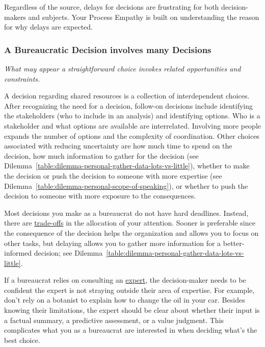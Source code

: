 Regardless of the source, delays for decisions are frustrating for both decision-makers and subjects. 
Your Process Empathy is built on understanding the reason for why delays are expected.


\subsubsection*{A Bureaucratic Decision involves many Decisions}

\textit{What may appear a straightforward choice invokes related opportunities and constraints.}

A decision regarding shared resources is a collection of interdependent choices. After recognizing the need for a decision, follow-on decisions include identifying the stakeholders (who to include in an analysis) and identifying options. Who is a stakeholder and what options are available are interrelated. Involving more people expands the number of options and the complexity of coordination. Other choices associated with reducing uncertainty are how much time to spend on the decision, how much information to gather for the decision (see Dilemma~\ref{table:dilemma-personal-gather-data-lots-vs-little}),
%
whether to make the decision or push the decision to someone with more expertise (see Dilemma~\ref{table:dilemma-personal-scope-of-speaking}), or whether to push the decision to someone with more exposure to the consequences.

Most decisions you make as a bureaucrat do not have hard deadlines. Instead, there are \hyperref[sec:dilemma-trilemma]{trade-offs} in the allocation of your attention. Sooner is preferable since the consequence of the decision helps the organization and allows you to focus on other tasks, but delaying allows you to gather more information for a better-informed decision; see 
Dilemma~\ref{table:dilemma-personal-gather-data-lots-vs-little}.


If a bureaucrat relies on consulting an
\hyperref[sec:expertise]{expert},
%
the decision-maker needs to be confident the expert is not  straying outside their area of expertise. For example, don't rely on a botanist  to explain how to change the oil in your car. 
Besides knowing their limitations, the expert should be clear about whether their input is a factual summary, a predictive assessment, or a value judgment. This complicates what you as a bureaucrat are interested in when deciding what's the best choice.


